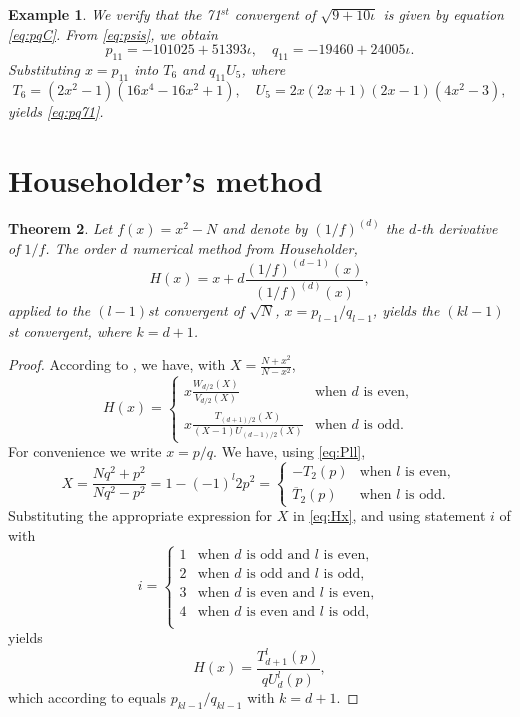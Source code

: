 \documentclass[a4paper,fleqn]{cas-sc}
\def\widebar#1{{\overline{#1}}}
\newtheorem{theorem}{Theorem}[section]
\newtheorem{example}[theorem]{Example}
\begin{document}
\begin{example}
We verify that the 71$^{st}$ convergent of $\sqrt{9+10\iota}$ is
given by equation \eqref{eq:pqC}. From \eqref{eq:psis}, we obtain
\[
p_{11}=-101025+51393 \iota,\quad  q_{11}= -19460+24005 \iota.
\]
Substituting $x=p_{11}$ into $T_6$ and $q_{11}U_5$, where
\[
T_6=(2x^2 - 1)(16x^4 - 16x^2 + 1), \quad U_5=2x(2x + 1)(2x - 1)(4x^2 - 3),
\]
yields \eqref{eq:pq71}.
\end{example}


\section{Householder's method} \label{sec:sec5}
\begin{theorem} \label{thm:HHT}
Let $f(x)=x^2-N$ and denote by $(1/f)^{(d)}$ the $d$-th derivative of $1/f$. The order $d$ numerical method from Householder,
\begin{equation} \label{eq:HHE}
H(x)=x+d\frac{(1/f)^{(d-1)}(x)}{(1/f)^{(d)}(x)},
\end{equation}
applied to the $(l-1)$st convergent of $\sqrt{N}$, $x=p_{l-1}/q_{l-1}$, yields the $(kl-1)$st convergent, where $k=d+1$.
\end{theorem}
\begin{proof}
According to \cite[Theorem 2]{YD}, we have, with $X=\frac{N+x^2}{N-x^2}$, 
\begin{equation} \label{eq:Hx}
H(x)=\begin{cases}
x\frac{W_{d/2}(X)}{V_{d/2}(X)} & \text{when } d \text{ is even},\\[1mm]
x\frac{T_{(d+1)/2}(X)}{(X-1)U_{(d-1)/2}(X)}
& \text{when } d \text{ is odd}.
\end{cases}
\end{equation}
For convenience we write $x=p/q$. We have, using \eqref{eq:Pll},
\[
X=\frac{Nq^2+p^2}{Nq^2-p^2}=1-(-1)^l2p^2=
\begin{cases}
-T_2(p) & \text{when } l \text{ is even},\\ 
\widebar{T}_2(p) & \text{when } l \text{ is odd}.
\end{cases}
\]
Substituting the appropriate expression for $X$ in \eqref{eq:Hx}, and using statement $i$ of  with
\[
i=\begin{cases}
1 & \text{when } d \text{ is odd and } l \text{ is even},\\
2 & \text{when } d \text{ is odd and } l \text{ is odd},\\
3 & \text{when } d \text{ is even and } l \text{ is even},\\ 
4 & \text{when } d \text{ is even and } l \text{ is odd},\\ 
\end{cases}
\]
yields
\[
H(x)=\frac{T^l_{d+1}(p)}{qU^l_d(p)},
\]
which according to  equals $p_{kl-1}/q_{kl-1}$ with $k=d+1$.
\end{proof}
\end{document}
